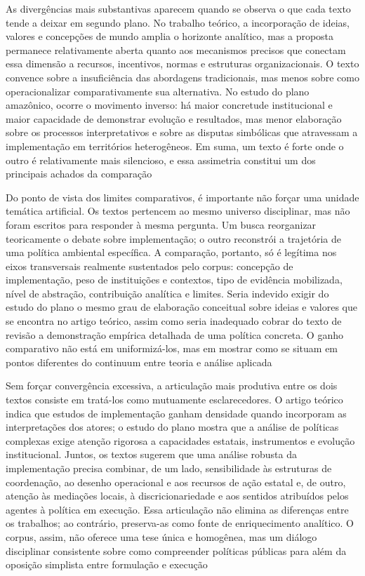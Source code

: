 \documentclass[12pt,a4paper]{article}
\begin{document}
As divergências mais substantivas aparecem quando se observa o que cada texto tende a deixar em segundo plano. No trabalho teórico, a incorporação de ideias, valores e concepções de mundo amplia o horizonte analítico, mas a proposta permanece relativamente aberta quanto aos mecanismos precisos que conectam essa dimensão a recursos, incentivos, normas e estruturas organizacionais. O texto convence sobre a insuficiência das abordagens tradicionais, mas menos sobre como operacionalizar comparativamente sua alternativa. No estudo do plano amazônico, ocorre o movimento inverso: há maior concretude institucional e maior capacidade de demonstrar evolução e resultados, mas menor elaboração sobre os processos interpretativos e sobre as disputas simbólicas que atravessam a implementação em territórios heterogêneos. Em suma, um texto é forte onde o outro é relativamente mais silencioso, e essa assimetria constitui um dos principais achados da comparação \parencite{ascenzi2013_implementacao_politicas,mello2017_evolucao_plano}

Do ponto de vista dos limites comparativos, é importante não forçar uma unidade temática artificial. Os textos pertencem ao mesmo universo disciplinar, mas não foram escritos para responder à mesma pergunta. Um busca reorganizar teoricamente o debate sobre implementação; o outro reconstrói a trajetória de uma política ambiental específica. A comparação, portanto, só é legítima nos eixos transversais realmente sustentados pelo corpus: concepção de implementação, peso de instituições e contextos, tipo de evidência mobilizada, nível de abstração, contribuição analítica e limites. Seria indevido exigir do estudo do plano o mesmo grau de elaboração conceitual sobre ideias e valores que se encontra no artigo teórico, assim como seria inadequado cobrar do texto de revisão a demonstração empírica detalhada de uma política concreta. O ganho comparativo não está em uniformizá-los, mas em mostrar como se situam em pontos diferentes do continuum entre teoria e análise aplicada \parencite{ascenzi2013_implementacao_politicas,mello2017_evolucao_plano}

Sem forçar convergência excessiva, a articulação mais produtiva entre os dois textos consiste em tratá-los como mutuamente esclarecedores. O artigo teórico indica que estudos de implementação ganham densidade quando incorporam as interpretações dos atores; o estudo do plano mostra que a análise de políticas complexas exige atenção rigorosa a capacidades estatais, instrumentos e evolução institucional. Juntos, os textos sugerem que uma análise robusta da implementação precisa combinar, de um lado, sensibilidade às estruturas de coordenação, ao desenho operacional e aos recursos de ação estatal e, de outro, atenção às mediações locais, à discricionariedade e aos sentidos atribuídos pelos agentes à política em execução. Essa articulação não elimina as diferenças entre os trabalhos; ao contrário, preserva-as como fonte de enriquecimento analítico. O corpus, assim, não oferece uma tese única e homogênea, mas um diálogo disciplinar consistente sobre como compreender políticas públicas para além da oposição simplista entre formulação e execução \parencite{ascenzi2013_implementacao_politicas,mello2017_evolucao_plano}
\end{document}
